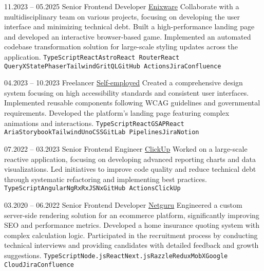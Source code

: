 \documentclass[9pt]{config}
\begin{document}


\begin{entrylist}
  \entry
  {11.2023 -- 05.2025}
  {Senior Frontend Developer}
  {\href{https://enixware.com}{Enixware}}
  {Collaborate with a multidisciplinary team on various projects, focusing on developing the user interface and minimizing technical debt. Built a high-performance landing page and developed an interactive browser-based game. Implemented an automated codebase transformation solution for large-scale styling updates across the application.}
  {\texttt{TypeScript}\slashsep\texttt{React}\slashsep\texttt{Astro}\slashsep\texttt{React Router}\slashsep\texttt{React Query}\slashsep\texttt{XState}\slashsep\texttt{Phaser}\slashsep\texttt{Tailwind}\slashsep\texttt{GritQL}\slashsep\texttt{GitHub Actions}\slashsep\texttt{Jira}\slashsep\texttt{Confluence}}

  \entry
  {04.2023 -- 10.2023}
  {Freelancer}
  {\href{https://jsarnowski.com}{Self-employed}}
  {Created a comprehensive design system focusing on high accessibility standards and consistent user interfaces. Implemented reusable components following WCAG guidelines and governmental requirements. Developed the platform's landing page featuring complex animations and interactions.}
  {\texttt{TypeScript}\slashsep\texttt{React}\slashsep\texttt{GSAP}\slashsep\texttt{React Aria}\slashsep\texttt{Storybook}\slashsep\texttt{Tailwind}\slashsep\texttt{UnoCSS}\slashsep\texttt{GitLab Pipelines}\slashsep\texttt{Jira}\slashsep\texttt{Notion}}

  \entry
  {07.2022 -- 03.2023}
  {Senior Frontend Engineer}
  {\href{https://clickup.com}{ClickUp}}
  {Worked on a large-scale reactive application, focusing on developing advanced reporting charts and data visualizations. Led initiatives to improve code quality and reduce technical debt through systematic refactoring and implementing best practices.}
  {\texttt{TypeScript}\slashsep\texttt{Angular}\slashsep\texttt{NgRx}\slashsep\texttt{RxJS}\slashsep\texttt{Nx}\slashsep\texttt{GitHub Actions}\slashsep\texttt{ClickUp}}

  \entry
  {03.2020 -- 06.2022}
  {Senior Frontend Developer}
  {\href{https://netguru.com}{Netguru}}
  {Engineered a custom server-side rendering solution for an ecommerce platform, significantly improving SEO and performance metrics. Developed a home insurance quoting system with complex calculation logic. Participated in the recruitment process by conducting technical interviews and providing candidates with detailed feedback and growth suggestions.}
  {\texttt{TypeScript}\slashsep\texttt{Node.js}\slashsep\texttt{React}\slashsep\texttt{Next.js}\slashsep\texttt{Razzle}\slashsep\texttt{Redux}\slashsep\texttt{MobX}\slashsep\texttt{Google Cloud}\slashsep\texttt{Jira}\slashsep\texttt{Confluence}}


\end{entrylist}
\end{document}
